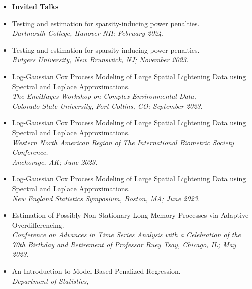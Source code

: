 \documentclass[11pt]{article}
\newcommand{\tab}{\hspace*{2em}}
\begin{document}
\begin{itemize}
	\item[] \textbf{Invited Talks} \vspace{-2mm}
		\item[] Testing and estimation for sparsity-inducing power penalties. \\
	\tab \emph{Dartmouth College, Hanover NH; February 2024.}\vspace{-2mm}
	\item[] Testing and estimation for sparsity-inducing power penalties. \\
	\tab \emph{Rutgers University, New Brunswick, NJ; November 2023.}\vspace{-2mm}
	\item[] Log-Gaussian Cox Process Modeling of Large Spatial Lightening Data using Spectral and Laplace Approximations. \\
	\tab \emph{The EnviBayes Workshop on Complex Environmental Data,} \\
	\tab \emph{Colorado State University, Fort Collins, CO; September 2023.}\vspace{-2mm}
	\item[] Log-Gaussian Cox Process Modeling of Large Spatial Lightening Data using Spectral and Laplace Approximations. \\
	\tab \emph{Western North American Region of The International Biometric Society Conference.} \\
	\tab \emph{Anchorage, AK; June 2023.}\vspace{-2mm}
	\item[] Log-Gaussian Cox Process Modeling of Large Spatial Lightening Data using Spectral and Laplace Approximations. \\
	\tab \emph{New England Statistics Symposium, Boston, MA; June 2023.}\vspace{-2mm}
	\item[] Estimation of Possibly Non-Stationary Long Memory Processes via Adaptive Overdifferencing. \\
	\tab \emph{Conference on Advances in Time Series Analysis with a Celebration of the} \\
	\tab \emph{70th Birthday and Retirement of Professor Ruey Tsay, Chicago, IL; May 2023.} \vspace{-2mm}
	\item[] An Introduction to Model-Based Penalized Regression. \\
	\tab \emph{Department of Statistics,} \\

\end{itemize}
\end{document}
